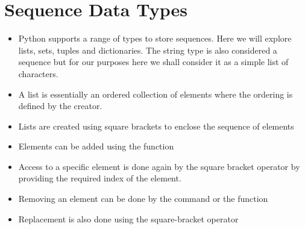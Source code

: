 \documentclass[letterpaper,10pt,english,openany]{sphinxmanual}
\begin{document}
\section{Sequence Data Types}
\label{\detokenize{introduction_to_python/sequence_data_types:sequence-data-types}}\label{\detokenize{introduction_to_python/sequence_data_types:id1}}\label{\detokenize{introduction_to_python/sequence_data_types::doc}}\begin{itemize}
\item {} 
Python supports a range of types to store sequences. Here we will
explore lists, sets, tuples and dictionaries. The string type is also
considered a sequence but for our purposes here we shall consider it
as a simple list of characters.

\item {} 
A list is essentially an ordered collection of elements where the
ordering is defined by the creator.

\item {} 
Lists are created using square brackets to enclose the sequence of
elements

\item {} 
Elements can be added using the  function

\item {} 
Access to a specific element is done again by the square bracket
operator by providing the required index of the element. 

\item {} 
Removing an element can be done by the  command or the
 function

\item {} 
Replacement is also done using the square-bracket operator

\end{itemize}
\end{document}
